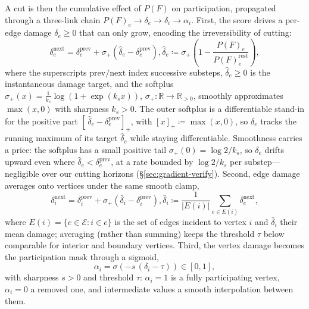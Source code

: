 \documentclass[letterpaper, 10 pt, conference]{ieeeconf}  %
\theoremstyle{tight}
\begin{document}
A cut is then the cumulative effect of $P(F)$ on participation,
propagated through a three-link chain
$P(F)_e\!\to\!\delta_e\!\to\!\delta_i\!\to\!\alpha_i$. First, the score
drives a per-edge damage $\delta_e\geq0$ that can only grow, encoding
the irreversibility of cutting:
\begin{equation}
  \delta_e^{\mathrm{next}} = \delta_e^{\mathrm{prev}} +
    \sigma_{+}\!\left(\hat{\delta}_e - \delta_e^{\mathrm{prev}}\right),
  \hat{\delta}_e \coloneqq
    \sigma_{+}\!\left(1 - \frac{P(F)_e}{P(F)_e^{\mathrm{rest}}}\right),
  \label{eq:edge-damage}
\end{equation}
where the superscripts $\mathrm{prev}/\mathrm{next}$ index successive
substeps, $\hat{\delta}_e\geq0$ is the instantaneous damage target, and
the softplus $\sigma_{+}(x)=\tfrac{1}{k_s}\log(1+\exp(k_s x))$,
$\sigma_{+}:\mathbb{R}\to\mathbb{R}_{>0}$, smoothly approximates
$\max(x,0)$ with sharpness $k_s>0$. The outer softplus is a
differentiable stand-in for the positive part
$[\,\hat{\delta}_e-\delta_e^{\mathrm{prev}}]_+$, with
$[x]_+\coloneqq\max(x,0)$, so $\delta_e$ tracks the running maximum of
its target $\hat{\delta}_e$ while staying differentiable. Smoothness
carries a price: the softplus has a small positive tail
$\sigma_{+}(0)=\log2/k_s$, so $\delta_e$ drifts upward even where
$\hat{\delta}_e<\delta_e^{\mathrm{prev}}$, at a rate bounded by
$\log2/k_s$ per substep---negligible over our cutting horizons
(\S\ref{sec:gradient-verify}). Second, edge damage averages onto
vertices under the same smooth clamp,
\begin{equation}
  \delta_i^{\mathrm{next}} = \delta_i^{\mathrm{prev}} +
    \sigma_{+}\!\left(\bar{\delta}_i - \delta_i^{\mathrm{prev}}\right),
  \bar{\delta}_i \coloneqq \frac{1}{|E(i)|}
      \sum_{e \in E(i)} \delta_e^{\mathrm{next}},
  \label{eq:vertex-damage}
\end{equation}
where $E(i)=\{e\in\mathcal{E}:i\in e\}$ is the set of edges incident to
vertex $i$ and $\bar{\delta}_i$ their mean damage; averaging (rather
than summing) keeps the threshold $\tau$ below comparable for interior
and boundary vertices. Third, the vertex damage becomes the
participation mask through a sigmoid,
\begin{equation}
  \alpha_i = \sigma\!\left(-s\,(\delta_i - \tau)\right) \in [0, 1],
  \label{eq:soft-removal}
\end{equation}
with sharpness $s>0$ and threshold $\tau$: $\alpha_i=1$ is a fully
participating vertex, $\alpha_i=0$ a removed one, and intermediate
values a smooth interpolation between them.
 
\end{document}

